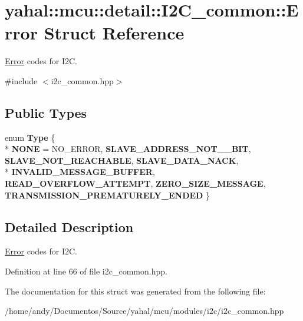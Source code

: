 \hypertarget{structyahal_1_1mcu_1_1detail_1_1_i2_c__common_1_1_error}{}\section{yahal\+:\+:mcu\+:\+:detail\+:\+:I2\+C\+\_\+common\+:\+:Error Struct Reference}
\label{structyahal_1_1mcu_1_1detail_1_1_i2_c__common_1_1_error}


\hyperlink{structyahal_1_1mcu_1_1detail_1_1_i2_c__common_1_1_error}{Error} codes for I2\+C.  




{\ttfamily \#include $<$i2c\+\_\+common.\+hpp$>$}

\subsection*{Public Types}
\begin{DoxyCompactItemize}
\item 
\hypertarget{structyahal_1_1mcu_1_1detail_1_1_i2_c__common_1_1_error_ac2ee747d9585b53623487e2a48d1809b}{}enum {\bfseries Type} \{ \\*
{\bfseries N\+O\+N\+E} = N\+O\+\_\+\+E\+R\+R\+O\+R, 
{\bfseries S\+L\+A\+V\+E\+\_\+\+A\+D\+D\+R\+E\+S\+S\+\_\+\+N\+O\+T\+\_\+\_\+\+B\+I\+T}, 
{\bfseries S\+L\+A\+V\+E\+\_\+\+N\+O\+T\+\_\+\+R\+E\+A\+C\+H\+A\+B\+L\+E}, 
{\bfseries S\+L\+A\+V\+E\+\_\+\+D\+A\+T\+A\+\_\+\+N\+A\+C\+K}, 
\\*
{\bfseries I\+N\+V\+A\+L\+I\+D\+\_\+\+M\+E\+S\+S\+A\+G\+E\+\_\+\+B\+U\+F\+F\+E\+R}, 
{\bfseries R\+E\+A\+D\+\_\+\+O\+V\+E\+R\+F\+L\+O\+W\+\_\+\+A\+T\+T\+E\+M\+P\+T}, 
{\bfseries Z\+E\+R\+O\+\_\+\+S\+I\+Z\+E\+\_\+\+M\+E\+S\+S\+A\+G\+E}, 
{\bfseries T\+R\+A\+N\+S\+M\+I\+S\+S\+I\+O\+N\+\_\+\+P\+R\+E\+M\+A\+T\+U\+R\+E\+L\+Y\+\_\+\+E\+N\+D\+E\+D}
 \}\label{structyahal_1_1mcu_1_1detail_1_1_i2_c__common_1_1_error_ac2ee747d9585b53623487e2a48d1809b}

\end{DoxyCompactItemize}


\subsection{Detailed Description}
\hyperlink{structyahal_1_1mcu_1_1detail_1_1_i2_c__common_1_1_error}{Error} codes for I2\+C. 

Definition at line 66 of file i2c\+\_\+common.\+hpp.



The documentation for this struct was generated from the following file\+:\begin{DoxyCompactItemize}
\item 
/home/andy/\+Documentos/\+Source/yahal/mcu/modules/i2c/i2c\+\_\+common.\+hpp\end{DoxyCompactItemize}
